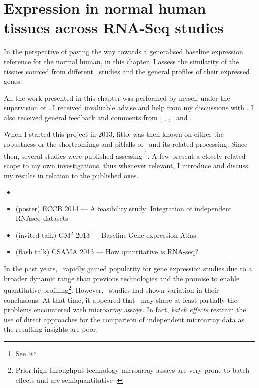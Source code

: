 \chapter{Expression in normal human tissues across RNA-Seq studies}
\label{ch:Transcriptomics}

In the perspective of paving the way towards
a generalised baseline expression reference for the normal human,
in this chapter, I assess the similarity
of the tissues sourced from different \Rnaseq\ studies and
the general profiles of their expressed genes.

All the work presented in this chapter was performed by myself under the
supervision of \alvis.
I received invaluable advise and help from my discussions with \nuno.
I also received general feedback and comments from \mar, \johan, \sarah, \gos\
and \wolfgang.

When I started this project in 2013,
little was then known on either the robustness or
the shortcomings and pitfalls of \Rnaseq\ and
its related processing.
Since then, several studies were published assessing \Rnaseq\footnote{See
\Cref{sec:TranssCoop}: \nameref{sec:TranssCoop}}.
A few present a closely related scope to my own investigations, thus
whenever relevant,
I introduce and discuss my results in relation to the published ones.


\derivativeWork{}
\begin{itemize}[topsep=0pt,nosep]
    \item {}
    \item (poster) ECCB 2014 --- A feasibility study:
        Integration of independent RNAseq datasets
    \item (invited talk) GM$^2$ 2013 --- Baseline Gene expression Atlas
    \item (flash talk) CSAMA 2013 --- How quantitative is RNA-seq?
\end{itemize}
\clearpage

In the past years,
\Rnaseq\ rapidly gained popularity
for gene expression studies
due to a broader dynamic range than previous technologies
and the promise to enable quantitative profiling\footnote{%
Prior high-throughput technology microarray assays are very prone
to batch effects and are semiquantitative \mycite{lee:2006}.
}.
However, \Rnaseq\ studies had shown variation in their conclusions. 
At that time,
it appeared that
\Rnaseq\ may share at least partially the problems encountered
with microarray assays.
In fact, \emph{batch effects} restrain the use of direct approaches
for the comparison of independent microarray data
as the resulting insights are poor.

